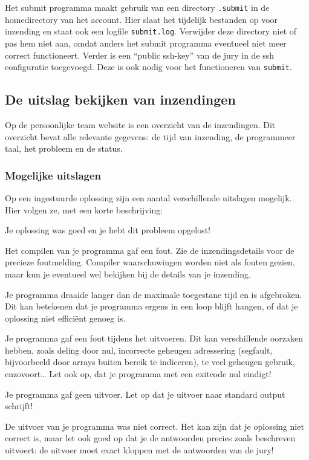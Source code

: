 \documentclass[11pt,titlepage,a4paper]{article}
\begin{document}
Het submit programma maakt gebruik van een directory \texttt{.submit}
in de homedirectory van het account. Hier slaat het tijdelijk
bestanden op voor inzending en staat ook een logfile \texttt{submit.log}.
Verwijder deze directory niet of pas hem niet aan, omdat anders het
submit programma eventueel niet meer correct functioneert. Verder
is een ``public ssh-key'' van de jury in de ssh configuratie
toegevoegd. Deze is ook nodig voor het functioneren van \texttt{submit}.
 
\subsection{De uitslag bekijken van inzendingen}

Op de persoonlijke team website is een overzicht van de inzendingen.
Dit overzicht bevat alle relevante gegevens: de tijd van inzending, de
programmeer taal, het probleem en de status.

\subsubsection{Mogelijke uitslagen}

Op een ingestuurde oplossing zijn een aantal verschillende uitslagen
mogelijk. Hier volgen ze, met een korte beschrijving:

\begin{description}[\setleftmargin{4.5cm}]
\item[CORRECT]
Je oplossing was goed en je hebt dit probleem opgelost!

\item[COMPILER-ERROR]
Het compilen van je programma gaf een fout. Zie de inzendingsdetails
voor de precieze foutmelding. Compiler waarschuwingen worden niet als
fouten gezien, maar kun je eventueel wel bekijken bij de details van
je inzending.

\item[TIMELIMIT]
Je programma draaide langer dan de maximale toegestane tijd en is
afgebroken. Dit kan betekenen dat je programma ergens in een loop
blijft hangen, of dat je oplossing niet effici\"ent genoeg is.

\item[RUN-ERROR]
Je programma gaf een fout tijdens het uitvoeren. Dit kan verschillende
oorzaken hebben, zoals deling door nul, incorrecte geheugen adressering
(segfault, bijvoorbeeld door arrays buiten bereik te indiceren), te
veel geheugen gebruik, enzovoort\dots
Let ook op, dat je programma met een exitcode nul eindigt!

\item[NO-OUTPUT]
Je programma gaf geen uitvoer. Let op dat je uitvoer naar standard
output schrijft!

\item[WRONG-ANSWER]
De uitvoer van je programma was niet correct. Het kan zijn dat je
oplossing niet correct is, maar let ook goed op dat je de antwoorden
precies zoals beschreven uitvoert: de uitvoer moet exact kloppen met
de antwoorden van de jury!

\end{description}
\end{document}
